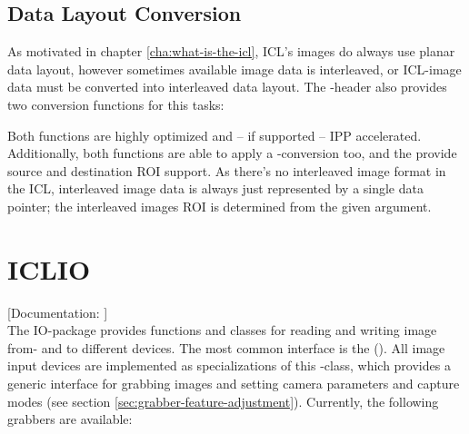  
\subsection{Data Layout Conversion}

As motivated in chapter \ref{cha:what-is-the-icl}, ICL's images do always use planar data layout, however sometimes available image data is interleaved, or ICL-image data must be converted into interleaved data layout. The -header also provides two conversion functions for this tasks: 

Both functions are highly optimized and -- if supported -- IPP accelerated. Additionally, both functions are able to apply a -conversion too, and the provide source and destination ROI support. As there's no interleaved image format in the ICL, interleaved image data is always just represented by a single data pointer; the interleaved images ROI is determined from the given  argument.





\section{ICLIO\label{sec:io}}

[Documentation: ]\\

The IO-package provides functions and classes for reading and writing image from- and to different devices. The most common interface is the  (). All image input devices are implemented as specializations of this -class, which provides a generic interface for grabbing images and setting camera parameters and capture modes (see section \ref{sec:grabber-feature-adjustment}). Currently, the following grabbers are available:

